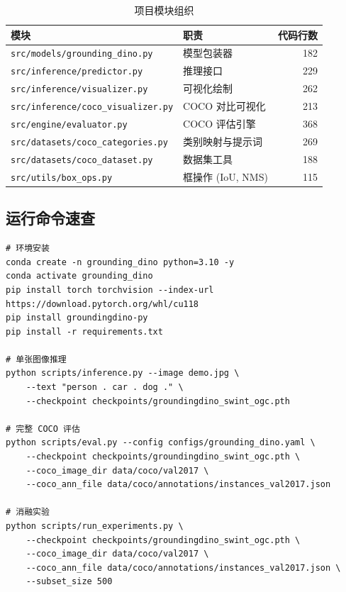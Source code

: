 \documentclass[12pt,a4paper]{ctexart}
\begin{document}
\begin{table}[H]
    \centering
    \caption{项目模块组织}
    \small
    \begin{tabular}{llr}
        \toprule
        \textbf{模块} & \textbf{职责} & \textbf{代码行数} \\
        \midrule
        \texttt{src/models/grounding\_dino.py} & 模型包装器 & 182 \\
        \texttt{src/inference/predictor.py} & 推理接口 & 229 \\
        \texttt{src/inference/visualizer.py} & 可视化绘制 & 262 \\
        \texttt{src/inference/coco\_visualizer.py} & COCO 对比可视化 & 213 \\
        \texttt{src/engine/evaluator.py} & COCO 评估引擎 & 368 \\
        \texttt{src/datasets/coco\_categories.py} & 类别映射与提示词 & 269 \\
        \texttt{src/datasets/coco\_dataset.py} & 数据集工具 & 188 \\
        \texttt{src/utils/box\_ops.py} & 框操作 (IoU, NMS) & 115 \\
        \bottomrule
    \end{tabular}
\end{table}

\subsection{运行命令速查}

{\small
\begin{verbatim}
# 环境安装
conda create -n grounding_dino python=3.10 -y
conda activate grounding_dino
pip install torch torchvision --index-url https://download.pytorch.org/whl/cu118
pip install groundingdino-py
pip install -r requirements.txt

# 单张图像推理
python scripts/inference.py --image demo.jpg \
    --text "person . car . dog ." \
    --checkpoint checkpoints/groundingdino_swint_ogc.pth

# 完整 COCO 评估
python scripts/eval.py --config configs/grounding_dino.yaml \
    --checkpoint checkpoints/groundingdino_swint_ogc.pth \
    --coco_image_dir data/coco/val2017 \
    --coco_ann_file data/coco/annotations/instances_val2017.json

# 消融实验
python scripts/run_experiments.py \
    --checkpoint checkpoints/groundingdino_swint_ogc.pth \
    --coco_image_dir data/coco/val2017 \
    --coco_ann_file data/coco/annotations/instances_val2017.json \
    --subset_size 500
\end{verbatim}
}
\end{document}
